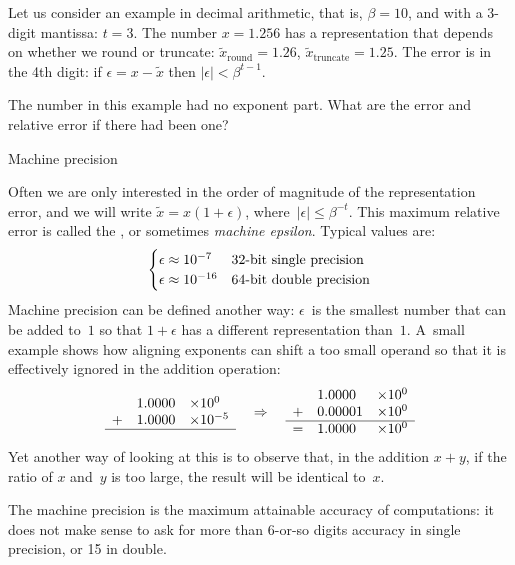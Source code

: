 Let us consider an example in decimal arithmetic, that is, $\beta=10$,
and with a 3-digit mantissa: $t=3$.  The number $x=1.256$ has a
representation that depends on whether we round or truncate: $\tilde
x_{\mathrm{round}}=1.26$, $\tilde x_{\mathrm{truncate}}=1.25$.
The error is in the 4th digit: if $\epsilon=x-\tilde x$ 
then $|\epsilon|<\beta^{t-1}$.
\begin{exercise}
The number in this example had no exponent part. What are the error
and relative error if there had been one?
\end{exercise}

 {Machine precision}
\label{sec:machine-eps}

Often we are only interested in the order of magnitude of the
representation error,
and we will write $\tilde x=x(1+\epsilon)$, where~$|\epsilon|\leq\beta^{-t}$.
This maximum relative error is called the , or sometimes \emph{machine epsilon}. Typical values are:
\[
\begin{cases}
  \epsilon\approx10^{-7}&\hbox{32-bit single precision}\\
  \epsilon\approx10^{-16}&\hbox{64-bit double precision}
\end{cases}
\]
Machine precision can be defined another way: $\epsilon$~is the
smallest number that can be added to~$1$ so that $1+\epsilon$ has a
different representation than~$1$. A~small example shows how aligning
exponents can shift a too small operand so that it is effectively ignored in
the addition operation:
\[
\begin{array}{cll}
   &1.0000&\times 10^0\\
  +&1.0000&\times 10^{-5}\\ \hline
\end{array}
\quad\Rightarrow\quad
\begin{array}{cll}
   &1.0000&\times 10^0\\
  +&0.00001&\times 10^0\\ \hline
  =&1.0000&\times 10^0
\end{array}
\]
Yet another way of looking at this
is to observe that, in the addition $x+y$, if the ratio of $x$ and~$y$
is too large, the result will be identical to~$x$.

The machine precision is the maximum attainable accuracy of
computations: it does not make sense to ask for more than 6-or-so
digits accuracy in single precision, or 15 in double.

